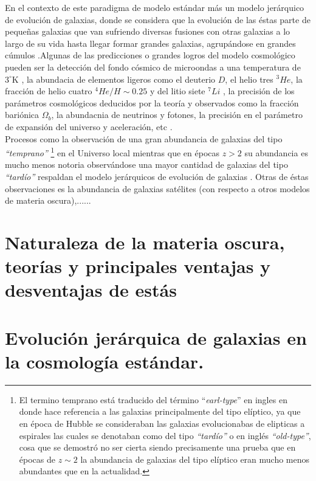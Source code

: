 En el contexto de este paradigma de modelo estándar más un modelo jerárquico de evolución de galaxias, donde se considera que la evolución de las éstas parte de pequeñas galaxias que van sufriendo diversas fusiones con otras galaxias a lo largo de su vida hasta llegar formar grandes galaxias, agrupándose en grandes cúmulos \addcite .Algunas de las predicciones o grandes logros del modelo cosmológico pueden ser la detección del fondo cósmico de microondas a una temperatura de $3^\circ\mathrm{K}$ \addcite, la abundacia de elementos ligeros como el deuterio $D$, el helio tres $^3He$, la fracción de helio cuatro $^4He/H\sim 0.25$ y del litio siete $^7Li$ \addcite , la precisión de los parámetros cosmológicos deducidos por la teoría y observados como la fracción bariónica $\Omega_b$, la abundacnia de neutrinos y fotones, la precisión en el parámetro de expansión del universo y aceleración, etc \addcite.\\

Procesos como la observación de una gran abundancia de galaxias del tipo \textit{``temprano''} \footnote{El termino temprano está traducido del término ``\textit{earl-type}'' en ingles en donde hace referencia a las galaxias principalmente del tipo elíptico, ya que en época de Hubble se consideraban las galaxias evolucionabas de elipticas a espirales las cuales se denotaban como del tipo \textit{``tardío''} o en inglés \textit{``old-type''}, cosa que se demostró no ser cierta siendo precisamente una prueba que en épocas de $z\sim 2$ la abundancia de galaxias del tipo elíptico eran mucho menos abundantes que en la actualidad.} en el Universo local mientras que en épocas $z >2$ su abundancia es mucho menos notoria observándose una mayor cantidad de galaxias del tipo \textit{``tardío''} \addcite respaldan el modelo jerárquicos de evolución de galaxias \addcite. Otras de éstas observaciones es la abundancia de galaxias satélites (con respecto a otros modelos de materia oscura),......



\section{Naturaleza de la materia oscura, teorías y principales ventajas y desventajas de estás}

\section{Evolución jerárquica de galaxias en la cosmología estándar.}

